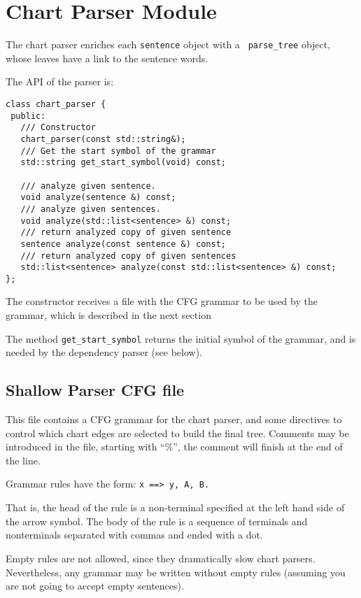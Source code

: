 \documentclass[a4paper]{book}
\begin{document}
\section{Chart Parser Module}

  The chart parser enriches each {\tt sentence} object with a {\tt
    parse\_tree} object, whose leaves have a link to the sentence
  words.

  The API of the parser is:
\begin{verbatim}
class chart_parser {
 public:
   /// Constructor
   chart_parser(const std::string&);
   /// Get the start symbol of the grammar
   std::string get_start_symbol(void) const;

   /// analyze given sentence.
   void analyze(sentence &) const;
   /// analyze given sentences.
   void analyze(std::list<sentence> &) const;
   /// return analyzed copy of given sentence
   sentence analyze(const sentence &) const;
   /// return analyzed copy of given sentences
   std::list<sentence> analyze(const std::list<sentence> &) const;
};
\end{verbatim}

  The constructor receives a file with the CFG grammar to be used by
  the grammar, which is described in the next section

  The method {\tt get\_start\_symbol} returns the initial symbol of the grammar, and
 is needed by the dependency parser (see below).

\subsection{Shallow Parser CFG file}
\label{file-cfg}

   This file contains a CFG grammar for the chart parser, and some
  directives to control which chart edges are selected to build the
  final tree.
  Comments may be introduced in the file, starting with ``\%'', the
  comment will finish at the end of the line.

   Grammar rules have the form: {\tt x ==> y, A, B.} 

   That is, the head of the rule is a non-terminal specified at the
   left hand side of the arrow symbol. The body of the rule is a
   sequence of terminals and nonterminals separated with commas and
   ended with a dot.

   Empty rules are not allowed, since they dramatically slow chart
   parsers. Nevertheless, any grammar may be written without empty
   rules (assuming you are not going to accept empty sentences).
  
\end{document}
